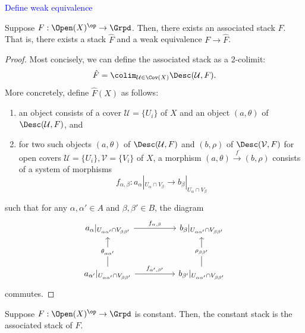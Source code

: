 \textcolor{blue}{Define weak equivalence}
\begin{theorem}
    Suppose \( F: \Open(X)^\op \to \Grpd \). Then, there exists an associated stack \( \hat{F} \). That is, there exists a stack \( \hat{F} \) and a weak equivalence \( F \to \hat{F} \).
\end{theorem}
\begin{proof}
    Most concisely, we can define the associated stack as a 2-colimit:
    \[ \hat{F} = \colim_{\mathcal{U} \in \Cov(X)} \Desc(\mathcal{U},F). \]
    More concretely, define \( \hat{F}(X) \) as follows:
    \begin{enumerate}
        \item an object consists of a cover \( \mathcal{U} = \{ U_i \} \) of \( X \) and an object \( (a,\theta) \) of \( \Desc(\mathcal{U},F) \), and
        \item for two such objects \( (a,\theta) \) of \( \Desc(\mathcal{U},F) \) and \( (b,\rho) \) of \( \Desc(\mathcal{V},F) \) for open covers \( \mathcal{U} = \{ U_i \}, \mathcal{V} = \{ V_i \} \) of \( X \), a morphism \( (a,\theta) \xrightarrow{f} (b,\rho) \) consists of a system of morphisms
        \[ f_{\alpha,\beta}: a_{\alpha}|_{U_\alpha \cap V_\beta} \to b_\beta|_{U_\alpha \cap V_\beta} \]
    \end{enumerate}
    such that for any \( \alpha,\alpha' \in A \) and \( \beta,\beta' \in B \), the diagram
    \[\begin{tikzcd}
    	{a_\alpha|_{U_{\alpha\alpha'}\cap V_{\beta\beta'}}} && {b_{\beta}|_{U_{\alpha\alpha'}\cap V_{\beta\beta'}}} \\
    	\\
    	{a_{\alpha'}|_{U_{\alpha\alpha'}\cap V_{\beta\beta'}}} && {b_{\beta'}|_{U_{\alpha\alpha'}\cap V_{\beta\beta'}}}
    	\arrow["{f_{\alpha,\beta}}", from=1-1, to=1-3]
    	\arrow["{\theta_{\alpha \alpha'}}"{description}, from=3-1, to=1-1]
    	\arrow["{f_{\alpha',\beta'}}", from=3-1, to=3-3]
    	\arrow["{\rho_{\beta\beta'}}"{description}, from=3-3, to=1-3]
    \end{tikzcd}\]
    commutes.
\end{proof}

\begin{example}
    Suppose \( F : \Open(X)^\op \to \Grpd \) is constant. Then, the constant stack is the associated stack of \( F \).
\end{example}